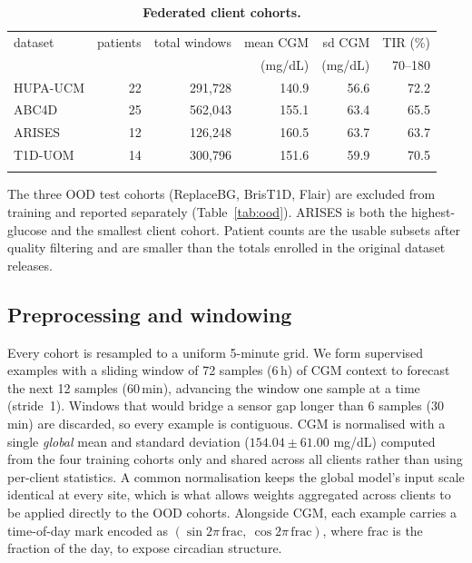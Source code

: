 \documentclass[10pt,letterpaper]{article}
\newlength\savedwidth
\newcommand\thickhline{\noalign{\global\savedwidth\arrayrulewidth\global\arrayrulewidth 2pt}%
\hline
\noalign{\global\arrayrulewidth\savedwidth}}
\begin{document}
\begin{table}[!ht]
\centering
\captionsetup{justification=centering,singlelinecheck=on}
\caption{\bf Federated client cohorts.}
\label{tab:datasets}
\begin{tabular}{lrrrrr}
\thickhline
dataset & patients & total windows & mean CGM & sd CGM & TIR (\%) \\
        &          &               & (mg/dL)  & (mg/dL) & 70--180  \\
\hline
HUPA-UCM & 22 & 291,728 & 140.9 & 56.6 & 72.2 \\
ABC4D    & 25 & 562,043 & 155.1 & 63.4 & 65.5 \\
ARISES   & 12 & 126,248 & 160.5 & 63.7 & 63.7 \\
T1D-UOM  & 14 & 300,796 & 151.6 & 59.9 & 70.5 \\
\thickhline
\end{tabular}
\begin{center}
{\small The three OOD test cohorts (ReplaceBG, BrisT1D, Flair) are excluded from
training and reported separately (Table~\ref{tab:ood}). ARISES is both the
highest-glucose and the smallest client cohort. Patient counts are the usable
subsets after quality filtering and are smaller than the totals enrolled in the
original dataset releases.}
\end{center}
\end{table}

\subsection*{Preprocessing and windowing}

Every cohort is resampled to a uniform 5-minute grid. We form supervised
examples with a sliding window of 72 samples (6\,h) of CGM context to forecast
the next 12 samples (60\,min), advancing the window one sample at a time
(stride~1). Windows that would bridge a sensor gap longer than 6 samples
(30\,min) are discarded, so every example is contiguous. CGM is normalised with
a single \emph{global} mean and standard deviation ($154.04 \pm 61.00$ mg/dL)
computed from the four training cohorts only and shared
across all clients rather than using per-client statistics. A common
normalisation keeps the global model's input scale identical at every site,
which is what allows weights aggregated across clients to be applied directly to
the OOD cohorts. Alongside CGM,
each example carries a time-of-day mark encoded
as $(\sin 2\pi\,\mathrm{frac},\ \cos 2\pi\,\mathrm{frac})$, where $\mathrm{frac}$
is the fraction of the day, to expose circadian structure.
\end{document}

